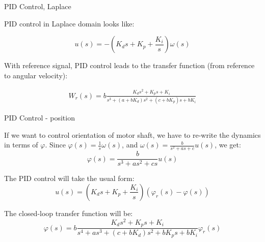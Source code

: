 \documentclass{beamer}
\begin{document}
\begin{frame}{PID Control, Laplace}
	\begin{flushleft}
		
		PID control in Laplace domain looks like:
		
		\begin{equation}
			u(s) =  - (K_d s + K_p + \frac{K_i}{s}) \omega(s)
		\end{equation}
		
		With reference signal, PID control leads to the transfer function (from reference to angular velocity):
		
		\begin{align}
			W_r(s) = b\frac{K_d s^2 + K_ps + K_i}{s^3  + (a+bK_d ) s^2  + (c+bK_p)s + bK_i}
		\end{align}
		
	\end{flushleft}
\end{frame}




\begin{frame}{PID Control - position}
	\begin{flushleft}
		
	If we want to control orientation of motor shaft, we have to re-write the dynamics in terms of $\varphi$. Since $\varphi(s) = \frac{1}{s} \omega(s)$, and $\omega(s) = \frac{b}{s^2 + a s+ c} u(s)$, we get:
	\begin{equation}
		\varphi(s) = \frac{b}{s^3 + a s^2 + cs} u(s)
	\end{equation}
		
	The PID control will take the usual form:
	\begin{equation}
		u(s) =  (K_d s + K_p + \frac{K_i}{s}) (\varphi_r(s) - \varphi(s))
	\end{equation}

	The closed-loop transfer function will be:
	\begin{equation}
		\varphi(s) = b\frac{K_d s^2 + K_ps + K_i}{s^4 + a s^3 + (c+bK_d)s^2 + bK_p s + bK_i} \varphi_r(s)
	\end{equation}
	
		
	\end{flushleft}
\end{frame}


\myqrframe
\end{document}

